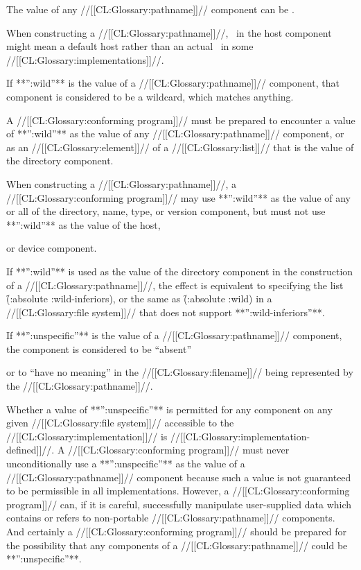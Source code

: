 The value of any //[[CL:Glossary:pathname]]// component can be \nil.

When constructing a //[[CL:Glossary:pathname]]//, \nil\ in the host component might mean a default host rather than an actual \nil\ in some //[[CL:Glossary:implementations]]//.

\endsubsubsubsection%

  

If **'':wild''** is the value of a //[[CL:Glossary:pathname]]// component, that component is considered to be a wildcard, which matches anything.

A //[[CL:Glossary:conforming program]]// must be prepared to encounter a value of **'':wild''** as the value of any //[[CL:Glossary:pathname]]// component, or as an //[[CL:Glossary:element]]// of a //[[CL:Glossary:list]]// that is the value of the directory component.

 When constructing a //[[CL:Glossary:pathname]]//, a //[[CL:Glossary:conforming program]]// may use **'':wild''** as the value of any or all of the directory, name, type,  or version component, but must not use **'':wild''** as the value of the host,

or device component.

If **'':wild''** is used as the value of the directory component in the construction of a //[[CL:Glossary:pathname]]//, the effect is equivalent to specifying the list \f{(:absolute :wild-inferiors)}, or the same as \f{(:absolute :wild)} in a //[[CL:Glossary:file system]]// that does not support **'':wild-inferiors''**.

\endsubsubsubsection%

  

If **'':unspecific''** is the value of a //[[CL:Glossary:pathname]]// component, the component is considered to be ``absent'' 

or to ``have no meaning'' in the //[[CL:Glossary:filename]]// being represented by the //[[CL:Glossary:pathname]]//.

Whether a value of **'':unspecific''** is permitted for any component on any given //[[CL:Glossary:file system]]// accessible to the //[[CL:Glossary:implementation]]// is //[[CL:Glossary:implementation-defined]]//. A //[[CL:Glossary:conforming program]]// must never unconditionally use a **'':unspecific''** as the value of a //[[CL:Glossary:pathname]]// component because such a value is not guaranteed to be permissible in all implementations. However, a //[[CL:Glossary:conforming program]]// can, if it is careful,  successfully manipulate user-supplied data  which contains or refers to non-portable //[[CL:Glossary:pathname]]// components. And certainly a //[[CL:Glossary:conforming program]]// should be prepared for the possibility that any components of a //[[CL:Glossary:pathname]]// could be **'':unspecific''**.

